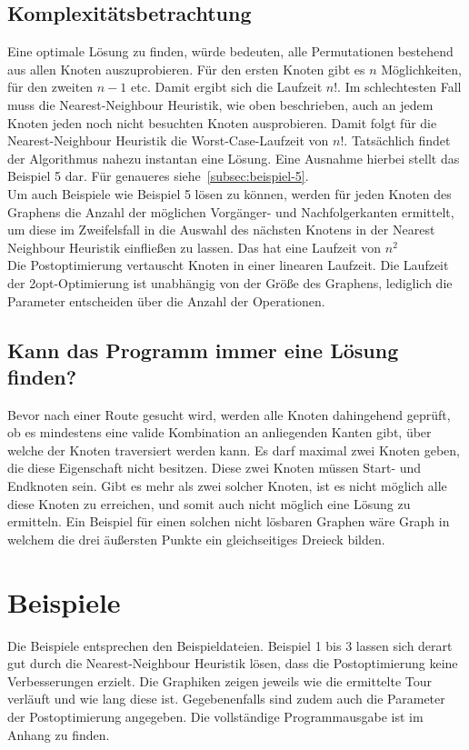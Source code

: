 \subsection{Komplexitätsbetrachtung}\label{subsec:komplexitatsbetrachtung}
Eine optimale Lösung zu finden, würde bedeuten, alle Permutationen bestehend aus allen Knoten auszuprobieren.
Für den ersten Knoten gibt es $n$ Möglichkeiten, für den zweiten $n - 1$ etc.
Damit ergibt sich die Laufzeit $n!$.
Im schlechtesten Fall muss die Nearest-Neighbour Heuristik, wie oben beschrieben, auch an jedem Knoten jeden noch nicht besuchten Knoten ausprobieren.
Damit folgt für die Nearest-Neighbour Heuristik die Worst-Case-Laufzeit von $n!$.
Tatsächlich findet der Algorithmus nahezu instantan eine Lösung.
Eine Ausnahme hierbei stellt das Beispiel 5 dar.
Für genaueres siehe~\ref{subsec:beispiel-5}. \\
Um auch Beispiele wie Beispiel 5 lösen zu können, werden für jeden Knoten des Graphens die Anzahl der möglichen
Vorgänger- und Nachfolgerkanten ermittelt, um diese im Zweifelsfall in die Auswahl des nächsten Knotens
in der Nearest Neighbour Heuristik einfließen zu lassen.
Das hat eine Laufzeit von $n^2$ \\
Die Postoptimierung vertauscht Knoten in einer linearen Laufzeit.
Die Laufzeit der 2opt-Optimierung ist unabhängig von der Größe des Graphens, lediglich die Parameter entscheiden über die
Anzahl der Operationen.

\subsection{Kann das Programm immer eine Lösung finden?}\label{subsec:losbarkeit}
Bevor nach einer Route gesucht wird, werden alle Knoten dahingehend geprüft, ob es mindestens eine valide Kombination
an anliegenden Kanten gibt, über welche der Knoten traversiert werden kann.
Es darf maximal zwei Knoten geben, die diese Eigenschaft nicht besitzen.
Diese zwei Knoten müssen Start- und Endknoten sein.
Gibt es mehr als zwei solcher Knoten, ist es nicht möglich alle diese Knoten zu erreichen, und somit auch nicht möglich
eine Lösung zu ermitteln.
Ein Beispiel für einen solchen nicht lösbaren Graphen wäre Graph in welchem
die drei äußersten Punkte ein gleichseitiges Dreieck bilden.


\section{Beispiele}\label{sec:beispiele}
Die Beispiele entsprechen den Beispieldateien.
Beispiel 1 bis 3 lassen sich derart gut durch die Nearest-Neighbour Heuristik lösen, dass die Postoptimierung keine Verbesserungen erzielt.
Die Graphiken zeigen jeweils wie die ermittelte Tour verläuft und wie lang diese ist.
Gegebenenfalls sind zudem auch die Parameter der Postoptimierung angegeben.
Die vollständige Programmausgabe ist im Anhang zu finden.

